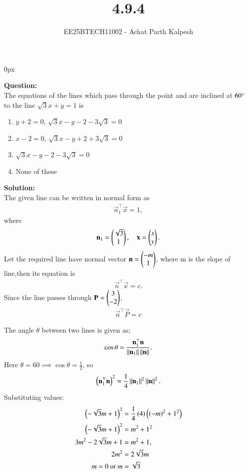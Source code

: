 \documentclass[journal]{IEEEtran}
\begin{document}

\title{4.9.4}
\author{EE25BTECH11002 - Achat Parth Kalpesh }
{\let\newpage\relax\maketitle}
\renewcommand{\thefigure}{\theenumi}
\renewcommand{\thetable}{\theenumi}
\setlength{\intextsep}{10pt} %
\renewcommand{\thetable}{\theenumi}
\parindent 0px


\textbf{Question:}\\
 The equations of the lines which pass through the point  and are inclined at $60\degree$ to the line $\sqrt{3} x+y=1$ is
\begin{enumerate}
\item $y+2=0$, $\sqrt{3}x-y-2-3\sqrt{3}=0$
\item $x-2=0$, $\sqrt{3}x-y+2+3\sqrt{3}=0$
\item $\sqrt{3}x-y-2-3\sqrt{3}=0$
\item None of these
\end{enumerate}

\textbf{Solution:}\\
The given line can be written in normal form as
\begin{align}
    \vec{n}_1^\top \vec{x} = 1,
\end{align}
where
\begin{align}
    \mathbf{n}_1 = \begin{pmatrix}\sqrt{3}\\1\end{pmatrix}, \quad \mathbf{x} = \begin{pmatrix}x\\y\end{pmatrix}.
\end{align}
Let the required line have normal vector $\mathbf{n}=\begin{pmatrix}-m\\1\end{pmatrix}$, where m is the slope of line,then its equation is
\begin{align}
    \vec{n}^\top \vec{x} = c.
\end{align}
Since the line passes through $\mathbf{P}=\begin{pmatrix}3\\-2\end{pmatrix}$,
\begin{align}
     \vec{n}^\top \vec{P} = c
\end{align}


The angle $\theta$ between two lines is given as;
\begin{align}
    \cos\theta = \frac{\mathbf{n}_1^\top \mathbf{n}}{\left\lVert\mathbf{n}_1\right\rVert\left\lVert\mathbf{n}\right\rVert}.
\end{align}
Here $\theta = $60\degree$ \implies \cos\theta = \frac{1}{2}$, so
\begin{align}
    \left(\mathbf{n}_1^\top \mathbf{n}\right)^2 = \frac{1}{4}\left\lVert\mathbf{n}_1\right\rVert^2 \left\lVert\mathbf{n}\right\rVert^2.
\end{align}
Substituting values:
\begin{align}
    \left(-\sqrt{3}m + 1\right)^2 &= \frac{1}{4}\left(4\right)\left(\left(-m\right)^2+1^2\right)\\
    \left(-\sqrt{3}m + 1\right)^2 &= m^2 + 1^2\\
    3m^2 - 2\sqrt{3}m + 1 &= m^2 + 1, \\
    2m^2 &= 2\sqrt{3}m  \\
    m = 0 \text{ or } m &= \sqrt{3}
\end{align}
\end{document}

